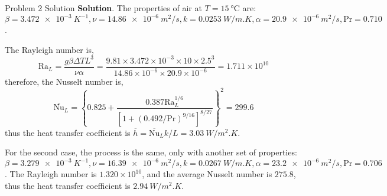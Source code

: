 \documentclass[9pt, aspectratio=169, handout]{beamer}
\begin{document}
\begin{frame}{Problem 2 Solution}
    \textbf{Solution}. The properties of air at $T = \SI{15}{\celsius}$ are: $\beta = \SI{3.472e-3}{K^{-1}}, \nu=\SI{14.86e-6}{m^2/s}, k=\SI{0.0253}{W/m.K}, \alpha=\SI{20.9e-6}{m^2/s}, \mathrm{Pr} = 0.710$.

    The Rayleigh number is,
    \begin{equation*}
        \mathrm{Ra}_L = \frac{g\beta\Delta T L^3}{\nu\alpha} = \frac{9.81 \times 3.472 \times 10^{-3} \times 10 \times 2.5^3}{14.86 \times 10^{-6} \times 20.9 \times 10^{-6}} = 1.711 \times 10^10
    \end{equation*}
    therefore, the Nusselt number is,
    \begin{equation*}
        \overline{\mathrm{Nu}}_L = \left\lbrace 0.825 + \frac{0.387 \mathrm{Ra}_L^{1/6}}{[1 + (0.492/\mathrm{Pr})^{9/16}]^{8/27}} \right\rbrace^2 = 299.6
    \end{equation*}
    thus the heat transfer coefficient is $\overline{h} = \overline{\mathrm{Nu}}_L k/L = \SI{3.03}{W/m^2.K}$.

    For the second case, the process is the same, only with another set of properties: $\beta = \SI{3.279e-3}{K^{-1}}, \nu=\SI{16.39e-6}{m^2/s}, k=\SI{0.0267}{W/m.K}, \alpha=\SI{23.2e-6}{m^2/s}, \mathrm{Pr} = 0.706$. The Rayleigh number is $1.320\times 10^{10}$, and the average Nusselt number is $275.8$, thus the heat transfer coefficient is $\SI{2.94}{W/m^2.K}$.
\end{frame}
\end{document}
